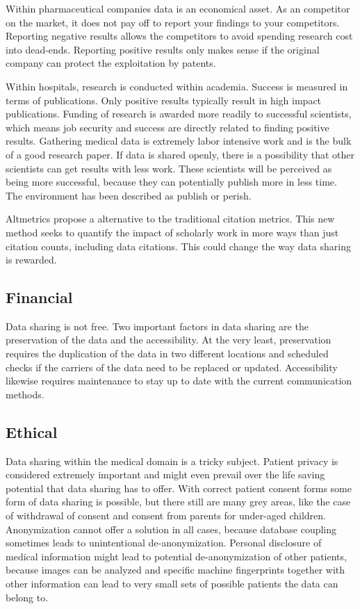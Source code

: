 Within pharmaceutical companies data is an economical asset. As an
competitor on the market, it does not pay off to report your findings
to your competitors. Reporting negative results allows the competitors
to avoid spending research cost into dead-ends. Reporting positive
results only makes sense if the original company can protect the
exploitation by patents.

Within hospitals, research is conducted within
academia. Success is measured in terms of
publications. Only positive results typically result in high impact
publications. Funding of research is awarded more readily to successful
scientists, which means job security and success are directly related
to finding positive results. Gathering medical data is extremely labor
intensive work and is the bulk of a good research paper. If data is
shared openly, there is a possibility that other scientists can get
results with less work. These scientists will be perceived as being
more successful, because they can potentially publish more in less
time. The environment has been described as publish or
perish.

Altmetrics\cite{Altmetrics} propose a
alternative to the traditional citation metrics. This new method seeks
to quantify the impact of scholarly work in more ways than just
citation counts, including data citations. This could change the way
data sharing is rewarded.

\subsection{Financial}

Data sharing is not free. Two important factors in data sharing are
the preservation of the data and the accessibility. At the very least,
preservation requires the duplication of the data in two different
locations and scheduled checks if the carriers of the data need to be
replaced or updated. Accessibility likewise requires maintenance to
stay up to date with the current communication methods.

\subsection{Ethical}

Data sharing within the medical domain is a tricky subject. Patient
privacy is considered extremely important and might even prevail over
the life saving potential that data sharing has to offer. With correct
patient consent forms some form of data sharing is possible, but there
still are many grey areas, like the case of withdrawal of consent and
consent from parents for under-aged children. Anonymization cannot
offer a solution in all cases, because database coupling sometimes
leads to unintentional de-anonymization. Personal disclosure of
medical information might lead to potential de-anonymization of other
patients, because images can be analyzed and specific machine
fingerprints together with other information can lead to very small
sets of possible patients the data can belong to.

